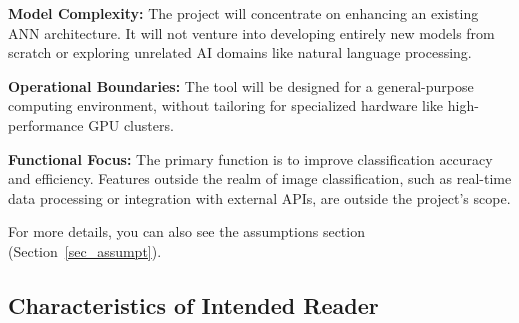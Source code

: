 \documentclass[12pt]{article}
\begin{document}
\begin{inparaitem}

\item \textbf{Model Complexity:} The project will concentrate on enhancing an existing ANN architecture. 
 It will not venture into developing entirely new models from scratch or exploring unrelated AI domains 
 like natural language processing.

\item \textbf{Operational Boundaries:} The tool will be designed for a general-purpose computing environment, 
 without tailoring for specialized hardware like high-performance GPU clusters.

\item \textbf{Functional Focus:} The primary function is to improve classification accuracy and efficiency. 
Features outside the realm of image classification, such as real-time data processing or integration with external 
APIs, are outside the project's scope.

\end{inparaitem}

For more details, you can also see the assumptions section (Section~\ref{sec_assumpt}).


\subsection{Characteristics of Intended Reader} \label{sec_IntendedReader}

\end{document}
